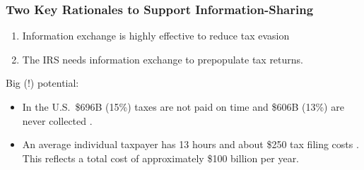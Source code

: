 \documentclass{beamer}
\begin{document}
\begin{frame}
\frametitle{Two Key Rationales to Support Information-Sharing}
\begin{enumerate}
    \item Information exchange is \alert{highly effective to reduce tax evasion} \parencite{kleven2011unwilling,pomeranz2015no,slemrod2017does}
    \vspace{0.5em}
    \item The IRS needs information exchange to \alert{prepopulate tax returns}.
\end{enumerate}
\vspace{2em}
Big (!) potential: 
\vspace{0.5em}
\begin{itemize}
    \item In the U.S.\ \$696B (15\%) taxes are not paid on time and \$606B (13\%) are never collected \parencite{IRS_TaxGap_2022_Pub5869}.
    \vspace{0.5em}
    \item An average individual taxpayer has 13 hours and about \$250 tax filing costs \parencite{IRS2022}. This reflects a total cost of approximately \$100 billion per year. 
\end{itemize}
\end{frame}
\end{document}

